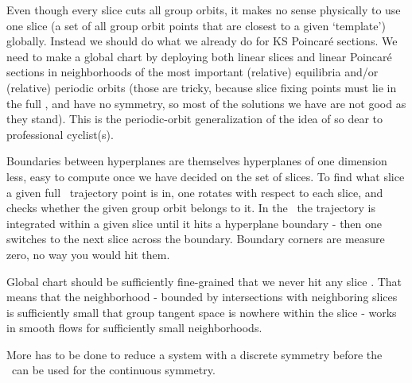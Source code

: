 Even though every slice cuts all group orbits, it makes no sense physically to
use one slice
(a set of all group orbit points that are closest to a given `template')
globally. Instead we should do what we already do for KS Poincar\'e sections.
We need to make a global chart by deploying both linear slices and linear
Poincar\'e sections in neighborhoods of the most important (relative)
equilibria and/or (relative) periodic orbits (those are tricky, because
slice fixing points must lie in the full \statesp, and have no symmetry,
so most of the solutions we have are not good as they stand). This is the
periodic-orbit generalization of the idea of
so dear to professional cyclist(s).


Boundaries
between hyperplanes are themselves hyperplanes of one dimension less,
easy to compute once we have decided on the set of slices. To find
what slice a given full \statesp\ trajectory point is in, one rotates
with respect to each slice, and checks whether the given group orbit
belongs to it. In the \reducedsp\ the trajectory is integrated within a
given slice until it hits a hyperplane boundary - then one switches to
the next slice across the boundary. Boundary corners are measure zero, no
way you would hit them.

Global chart should be sufficiently fine-grained that we never hit any
slice {\sset}. That means that the neighborhood - bounded by
intersections with neighboring slices is sufficiently small that group
tangent space is nowhere within the slice - works in smooth flows
for sufficiently small neighborhoods.


More has to be done to reduce a system with a discrete
symmetry before the \mslices\ can be used for the continuous symmetry.
